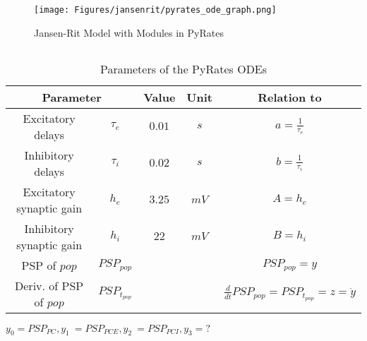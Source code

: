 \begin{figure}[H]
	\centering
	\texttt{[image: Figures/jansenrit/pyrates\_ode\_graph.png]}
	\caption{Jansen-Rit Model with Modules in PyRates \parencite{gast_pyratespython_2019}}
	\label{Fig: PyratesODE}
\end{figure}

\subsection{\parencite{gast_pyratespython_2019}}
\begin{table}[H]
	\centering
	\begin{tabular}{ |c|c|c|c|c| } 
		\hline
		\multicolumn{2}{|c|}{Parameter}  & Value & Unit & Relation to \parencite{jansen_electroencephalogram_1995} \\
		\hline
		\hline
		\rule{0pt}{3ex}Excitatory delays & \(\tau_e\) & \(0.01\) & $s$ & $ a = \frac{1}{\tau_e} $ \\[1.2ex]
		\hline
		\rule{0pt}{3ex}Inhibitory delays & \(\tau_i\) & \(0.02\) & $s$ & $ b = \frac{1}{\tau_i} $\\[1.2ex]
		\hline
		\rule{0pt}{3ex}Excitatory synaptic gain & \(h_e\) & \(3.25\) & $mV$ & $ A = h_e $ \\[1.2ex]
		\hline
		\rule{0pt}{3ex}Inhibitory synaptic gain & \(h_i\) & \(22\) & $mV$ & $ B = h_i $ \\[1.2ex]
		\hline
		\rule{0pt}{3ex}PSP of $pop$ & \(PSP_{pop}\) &  & & $ PSP_{pop} = y  $ \\[1.2ex]
		\hline
		\rule{0pt}{3ex} Deriv. of PSP of $pop$  & \(PSP_{t_{pop}}\) &  & & $\frac{d}{dt}PSP_{pop} = PSP_{t_{pop}} = z = \dot{y}$ \\[1.2ex]
		\hline
	\end{tabular}
	\caption{Parameters of the PyRates ODEs}
\end{table}


$y_0 = PSP_{PC}, y_1 ~= PSP_{PCE}, y_2 ~= PSP_{PCI}, y_3=?$ 

